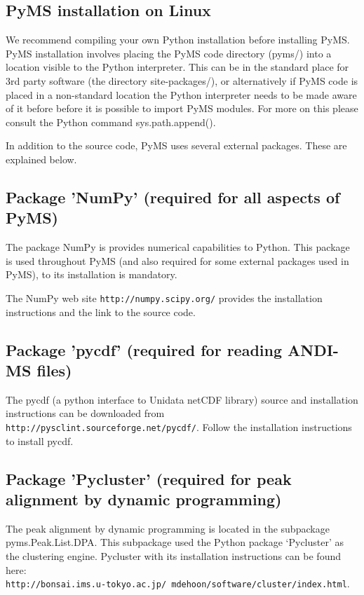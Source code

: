 \subsection{PyMS installation on Linux}

We recommend compiling your own Python installation before installing
PyMS. PyMS installation involves placing the PyMS code directory (pyms/)
into a location visible to the Python interpreter. This can be in the
standard place for 3rd party software (the directory site-packages/), or
alternatively if PyMS code is placed in a non-standard location the
Python interpreter needs to be made aware of it before before it is
possible to import PyMS modules. For more on this please consult the
Python command sys.path.append().

In addition to the source code, PyMS uses several external packages.
These are explained below.

\subsection{\label{subsec:numpy}Package 'NumPy' (required for all
aspects of PyMS)}

The package NumPy is provides numerical capabilities to Python. This
package is used throughout PyMS (and also required for some external
packages used in PyMS), to its installation is mandatory.

The NumPy web site {\tt http://numpy.scipy.org/} provides the installation
instructions and the link to the source code.

\subsection{\label{subsec:pycdf}Package 'pycdf' (required for reading
ANDI-MS files)}

The pycdf (a python interface to Unidata netCDF library) source and
installation instructions can be downloaded from\\
{\tt http://pysclint.sourceforge.net/pycdf/}. Follow the installation
instructions to install pycdf.

\subsection{\label{subsec:pycluster}Package 'Pycluster' (required for peak
alignment by dynamic programming)}

The peak alignment by dynamic programming is located in the subpackage
pyms.Peak.List.DPA. This subpackage used the Python package `Pycluster'
as the clustering engine. Pycluster with its installation instructions
can be found here:\\
{\tt http://bonsai.ims.u-tokyo.ac.jp/~mdehoon/software/cluster/index.html}.

